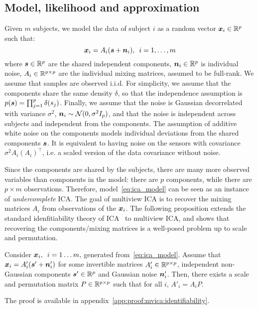 \subsection{Model, likelihood and approximation}
%
Given $m$ subjects, we model the data of subject $i$ as a random vector
$\boldsymbol{x}_i\in\mathbb{R}^p$  such that:
\begin{equation}
\label{eq:ica_model}
    \boldsymbol{x}_i = A_i(\boldsymbol{s} + \boldsymbol{n}_i), \enspace i=1,\dots, m
\end{equation}
where $\boldsymbol{s} \in \mathbb{R}^p$ are the shared independent components, $\boldsymbol{n}_i \in \mathbb{R}^p$ is individual noise, $A_i \in \mathbb{R}^{p\times p}$ are the individual mixing matrices, assumed to be full-rank.
%
We assume that samples are observed i.i.d. For simplicity, we assume that the components share the same density $\delta$, so that the independence assumption is $p(\boldsymbol{s}) = \prod_{j=1}^p \delta(s_j)$. Finally, we assume that the noise is Gaussian decorrelated with variance $\sigma^2$, $\boldsymbol{n}_i \sim \mathcal{N}(0, \sigma^2I_p)$, and that the noise is independent across subjects and independent from the components.
The assumption of additive white noise on the components models individual deviations from the shared components $\boldsymbol{s}$.
It is equivalent to having noise on the sensors with covariance $\sigma^2 A_i \left(A_i\right)^{\top}$, i.e. a scaled version of the data covariance without noise.

Since the components are shared by the subjects, there are many more observed variables than components in the model: there are $p$ components, while there are $p \times m$ observations.
%
Therefore, model~\eqref{eq:ica_model} can be seen as an instance of \emph{undercomplete} ICA.
%
The goal of multiview ICA is to recover the mixing matrices $A_i$ from observations of the $\boldsymbol{x}_i$.
%
The following proposition extends the standard idenfitiability theory of ICA~\cite{comon1994independent} to multiview ICA, and shows that recovering the components/mixing matrices is a well-posed problem up to scale and permutation.
%
\begin{proposition}
\label{prop:identifiability}
Consider $\boldsymbol{x}_i, \enspace i=1\dots m,$ generated from~\eqref{eq:ica_model}. Assume that $\boldsymbol{x}_i = A'_i(\boldsymbol{s}' + \boldsymbol{n}'_i)$ for some invertible matrices $A'_i\in \mathbb{R}^{p\times p}$, independent non-Gaussian components $\boldsymbol{s}'\in \mathbb{R}^p$ and Gaussian noise $\boldsymbol{n}'_i$. Then, there exists a scale and permutation matrix $P\in \mathbb{R}^{p\times p}$ such that for all $i$, $A'_i = A_i P$.
\end{proposition}
The proof is available in appendix~\ref{app:proof:mvica:identifiability}.


